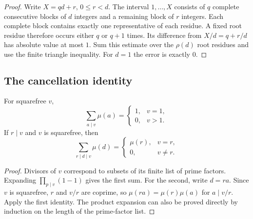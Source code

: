 \begin{proof}
Write \(X=qd+r\), \(0\le r<d\). The interval \(1,\ldots,X\)
consists of \(q\) complete consecutive blocks of \(d\) integers and a
remaining block of \(r\) integers. Each complete block contains exactly
one representative of each residue. A fixed root residue therefore occurs
either \(q\) or \(q+1\) times. Its difference from \(X/d=q+r/d\)
has absolute value at most \(1\). Sum this estimate over the
\(\rho(d)\) root residues and use the finite triangle inequality.
For \(d=1\) the error is exactly \(0\).
\end{proof}

\subsection{The cancellation identity}

\begin{lemma}
\label{lem:mobius}
For squarefree \(v\),
\[
 \sum_{a\mid v}\mu(a)=
 \begin{cases}1,&v=1,\\0,&v>1.\end{cases}
\]
If \(r\mid v\) and \(v\) is squarefree, then
\begin{equation}
 \sum_{r\mid d\mid v}\mu(d)=
 \begin{cases}\mu(r),&v=r,\\0,&v\ne r.\end{cases}
 \label{eq:interval-mobius}
\end{equation}
\end{lemma}

\begin{proof}
Divisors of \(v\) correspond to subsets of its finite list of prime factors.
Expanding \(\prod_{p\mid v}(1-1)\) gives the first sum. For the second,
write \(d=ra\). Since \(v\) is squarefree, \(r\) and \(v/r\) are coprime,
so \(\mu(ra)=\mu(r)\mu(a)\) for \(a\mid v/r\). Apply the first identity.
The product expansion can also be proved directly by induction on the
length of the prime-factor list.
\end{proof}

